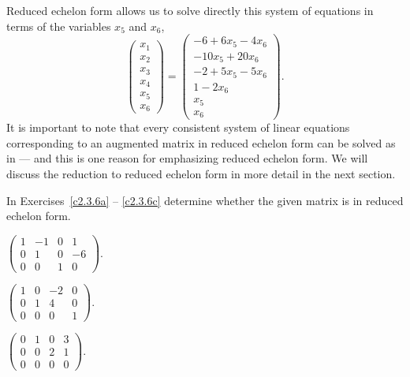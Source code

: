 Reduced echelon form allows us to solve directly this system of
equations in terms of the variables $x_5$ and $x_6$,
\begin{equation}  \label{e:refexamp6}
\left(\begin{array}{c} x_1\\x_2\\x_3\\x_4\\x_5\\x_6\end{array}\right) =
\left(\begin{array}{c} -6+6x_5-4x_6\\-10x_5+20x_6\\
-2+5x_5-5x_6\\1-2x_6\\x_5\\x_6\end{array}\right).
\end{equation}
It is important to note that every consistent system of linear equations
corresponding to an augmented matrix in reduced echelon form can be
solved as in  --- and this is one reason for emphasizing
reduced echelon form.  We will discuss the reduction to reduced echelon
form in more detail in the next section.

\EXER


\TEXER

\noindent In Exercises~\ref{c2.3.6a} -- \ref{c2.3.6c} determine
whether the given matrix is in reduced echelon form.
\begin{exercise} \label{c2.3.6a}
$\left(\begin{array}{rrrr}
1 & -1 &  0 &   1   \\
0 &  1 &  0 &  -6    \\
0 &  0 &  1 &   0   \end{array}\right)$.
\end{exercise}
\begin{exercise} \label{c2.3.6b}
$\left(\begin{array}{rrrr}
1 &  0 & -2 &   0   \\
0 &  1 &  4 &   0    \\
0 &  0 &  0 &   1  \end{array}\right)$.
\end{exercise}
\begin{exercise} \label{c2.3.6c}
$\left(\begin{array}{rrrr}
0 &  1 &  0 &   3   \\
0 &  0 &  2 &   1    \\
0 &  0 &  0 &   0   \end{array}\right)$.
\end{exercise}

